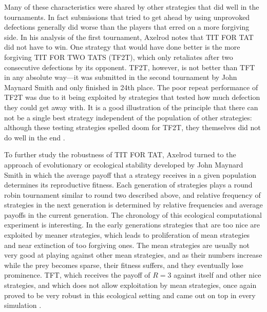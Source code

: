 Many of these characteristics were shared by other strategies that did well in the tournaments. In fact submissions that tried to get ahead by using unprovoked defections generally did worse than the players that erred on a more forgiving side. In his analysis of the first tournament, Axelrod notes that TIT FOR TAT did not have to win. One strategy that would have done better is the more forgiving TIT FOR TWO TATS (TF2T), which only retaliates after two consecutive defections by its opponent. TF2T, however, is not better than TFT in any absolute way---it was submitted in the second tournament by John Maynard Smith and only finished in 24th place. The poor repeat performance of TF2T was due to it being exploited by strategies that tested how much defection they could get away with. It is a good illustration of the principle that there can not be a single best strategy independent of the population of other strategies: although these testing strategies spelled doom for TF2T, they themselves did not do well in the end \cite[p.47]{axelrod1984evolution}.

To further study the robustness of TIT FOR TAT, Axelrod turned to the approach of evolutionary or ecological stability developed by John Maynard Smith in which the average payoff that a strategy receives in a given population determines its reproductive fitness. Each generation of strategies plays a round robin tournament similar to round two described above, and relative frequency of strategies in the next generation is determined by relative frequencies and average payoffs in the current generation. The chronology of this ecological computational experiment is interesting. In the early generations strategies that are too nice are exploited by meaner strategies, which leads to proliferation of mean strategies and near extinction of too forgiving ones. The mean strategies are usually not very good at playing against other mean strategies, and as their numbers increase while the prey becomes sparse, their fitness suffers, and they eventually lose prominence. TFT, which receives the payoff of $R = 3$ against itself and other nice strategies, and which does not allow exploitation by mean strategies, once again proved to be very robust in this ecological setting and came out on top in every simulation \cite[p.53]{axelrod1984evolution}.

